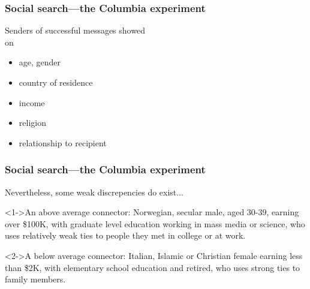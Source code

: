 \begin{frame}
  \frametitle{Social search---the Columbia experiment}


  Senders of successful messages showed\\
   on
  \begin{itemize}
  \item<1->
    age, gender
  \item<2->
    country of residence
  \item<3-> 
    income
  \item<4-> 
    religion
  \item<5-> 
    relationship to recipient
  \end{itemize}

  \bigskip


\end{frame}


\begin{frame}
  \frametitle{Social search---the Columbia experiment}






Nevertheless, some weak discrepencies do exist...

\begin{block}<1->{An above average connector:}
  Norwegian, secular male, aged 30-39, earning over \$100K, 
  with graduate level education working in mass media or science,
  who uses relatively weak ties to people
  they met in college or at work.
\end{block}

\begin{block}<2->{A below average connector:}
  Italian, Islamic or Christian female earning less than \$2K,
  with elementary school education and retired,
  who uses strong ties to family members.
\end{block}

\end{frame}

